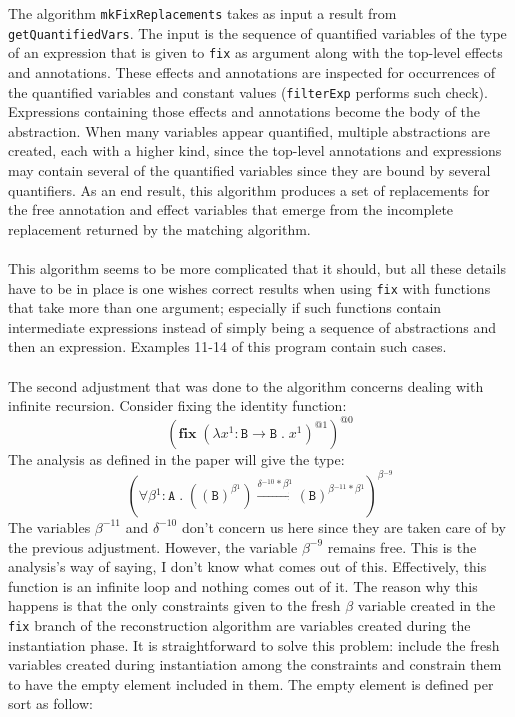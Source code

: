 \documentclass[8pt]{extarticle}
\begin{document}
The algorithm \verb+mkFixReplacements+ takes as input a result from \verb+getQuantifiedVars+. The input is the sequence of quantified variables of the type of an expression that is given to \verb+fix+ as argument along with the top-level effects and annotations. These effects and annotations are inspected for occurrences of the quantified variables and constant values (\verb+filterExp+ performs such check). Expressions containing those effects and annotations become the body of the abstraction. When many variables appear quantified, multiple abstractions are created, each with a higher kind, since the top-level annotations and expressions may contain several of the quantified variables since they are bound by several quantifiers. As an end result, this algorithm produces a set of replacements for the free annotation and effect variables that emerge from the incomplete replacement returned by the matching algorithm.
\\\\
This algorithm seems to be more complicated that it should, but all these details have to be in place is one wishes correct results when using \verb+fix+ with functions that take more than one argument; especially if such functions contain intermediate expressions instead of simply being a sequence of abstractions and then an expression. Examples 11-14 of this program contain such cases.
\\\\
The second adjustment that was done to the algorithm concerns dealing with infinite recursion. Consider fixing the identity function:
\[
\left(\mathbf{fix}\;{}\left(\lambda{}x^{1}:\mathtt{B}\to{}\mathtt{B}\;{}.\;{}x^{1}\right)^{\mathit{@1}}\right)^{\mathit{@0}}
\]
The analysis as defined in the paper will give the type:
\[
\left(\forall{}\beta{}^{1}:\mathtt{A}\;{}.\;{}\left(\left(\mathtt{B}\right)^{\beta{}^{1}}\right)\xrightarrow{\delta{}^{-10}*\beta{}^{1}}\left(\mathtt{B}\right)^{\beta{}^{-11}*\beta{}^{1}}\right)^{\beta{}^{-9}}
\]
The variables $\beta^{-11}$ and $\delta^{-10}$ don't concern us here since they are taken care of by the previous adjustment. However, the variable $\beta^{-9}$ remains free. This is the analysis's way of saying, I don't know what comes out of this. Effectively, this function is an infinite loop and nothing comes out of it. The reason why this happens is that the only constraints given to the fresh $\beta$ variable created in the \verb+fix+ branch of the reconstruction algorithm are variables created during the instantiation phase. It is straightforward to solve this problem: include the fresh variables created during instantiation among the constraints and constrain them to have the empty element included in them. The empty element is defined per sort as follow:
\end{document}
